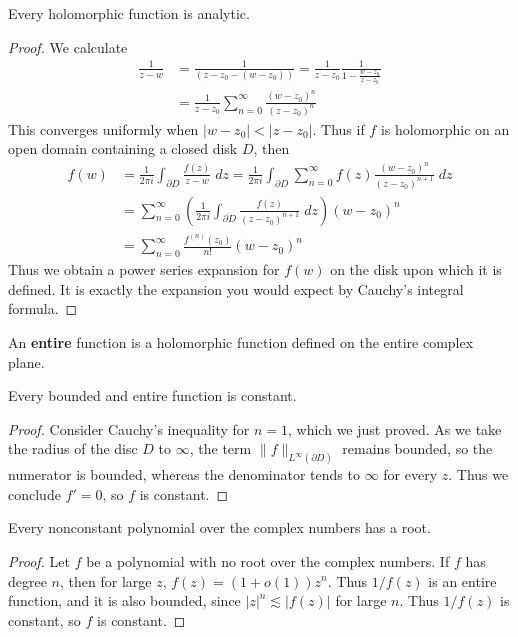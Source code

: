 \begin{theorem}
    Every holomorphic function is analytic.
\end{theorem}
\begin{proof}
    We calculate
%
\begin{align*}
    \frac{1}{z - w} &= \frac{1}{(z - z_0 - (w - z_0))} = \frac{1}{z - z_0} \frac{1}{1 - \frac{w - z_0}{z - z_0}}\\
    &= \frac{1}{z - z_0} \sum_{n = 0}^\infty \frac{(w - z_0)^n}{(z - z_0)^n}
\end{align*}
%
This converges uniformly when $|w - z_0| < |z - z_0|$. Thus if $f$ is holomorphic on an open domain containing a closed disk $D$, then
%
\begin{align*}
    f(w) &= \frac{1}{2 \pi i} \int_{\partial D} \frac{f(z)}{z - w}\; dz = \frac{1}{2 \pi i} \int_{\partial D} \sum_{n = 0}^\infty f(z) \frac{(w - z_0)^n}{(z - z_0)^{n+1}}\; dz\\
    &= \sum_{n = 0}^\infty \left( \frac{1}{2 \pi i} \int_{\partial D} \frac{f(z)}{(z - z_0)^{n+1}}\; dz \right) (w - z_0)^n\\
    &= \sum_{n = 0}^\infty \frac{f^{(n)}(z_0)}{n!} (w - z_0)^n
\end{align*}
%
Thus we obtain a power series expansion for $f(w)$ on the disk upon which it is defined. It is exactly the expansion you would expect by Cauchy's integral formula.
\end{proof}

An {\bf entire} function is a holomorphic function defined on the entire complex plane.

\begin{theorem}[Louville]
    Every bounded and entire function is constant.
\end{theorem}
\begin{proof}
    Consider Cauchy's inequality for $n = 1$, which we just proved. As we take the radius of the disc $D$ to $\infty$, the term $\| f \|_{L^\infty(\partial D)}$ remains bounded, so the numerator is bounded, whereas the denominator tends to $\infty$ for every $z$. Thus we conclude $f' = 0$, so $f$ is constant.
\end{proof}

\begin{theorem}
    Every nonconstant polynomial over the complex numbers has a root.
\end{theorem}
\begin{proof}
    Let $f$ be a polynomial with no root over the complex numbers. If $f$ has degree $n$, then for large $z$, $f(z) = (1 + o(1))z^n$. Thus $1/f(z)$ is an entire function, and it is also bounded, since $|z|^n \lesssim |f(z)|$ for large $n$. Thus $1/f(z)$ is constant, so $f$ is constant.
\end{proof}

